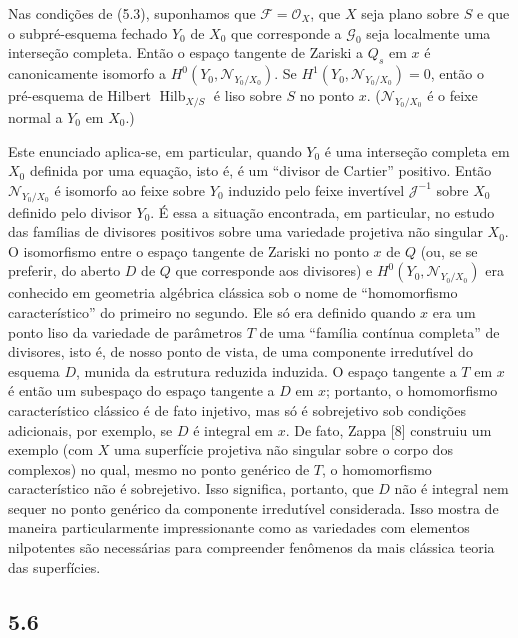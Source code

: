  Nas condições de (5.3), suponhamos que
$\mathcal F=\mathcal O_X$, que $X$ seja plano sobre $S$ e que o
subpré-esquema fechado $Y_0$ de $X_0$ que corresponde a $\mathcal G_0$ seja
localmente uma interseção completa. Então o espaço tangente de Zariski a $Q_s$
em $x$ é canonicamente isomorfo a
$H^0(Y_0,\mathcal N_{Y_0/X_0})$. Se
$H^1(Y_0,\mathcal N_{Y_0/X_0})=0$, então o pré-esquema de Hilbert
$\operatorname{Hilb}_{X/S}$ é liso sobre $S$ no ponto $x$.
($\mathcal N_{Y_0/X_0}$ é o feixe normal a $Y_0$ em $X_0$.)

 Este enunciado aplica-se, em particular, quando $Y_0$
é uma interseção completa em $X_0$ definida por uma equação, isto é, é um
``divisor de Cartier'' positivo. Então $\mathcal N_{Y_0/X_0}$ é isomorfo ao
feixe sobre $Y_0$ induzido pelo feixe invertível $\mathcal J^{-1}$ sobre $X_0$
definido pelo divisor $Y_0$. É essa a situação encontrada, em particular, no
estudo das famílias de divisores positivos sobre uma variedade projetiva não
singular $X_0$. O isomorfismo entre o espaço tangente de Zariski no ponto $x$
de $Q$ (ou, se se preferir, do aberto $D$ de $Q$ que corresponde aos divisores)
e $H^0(Y_0,\mathcal N_{Y_0/X_0})$ era conhecido em geometria algébrica
clássica sob o nome de ``homomorfismo característico'' do primeiro no segundo.
Ele só era definido quando $x$ era um ponto liso da variedade de parâmetros
$T$ de uma ``família contínua completa'' de divisores, isto é, de nosso ponto
de vista, de uma componente irredutível do esquema $D$, munida da estrutura
reduzida induzida. O espaço tangente a $T$ em $x$ é então um subespaço do
espaço tangente a $D$ em $x$; portanto, o homomorfismo característico clássico
é de fato injetivo, mas só é sobrejetivo sob condições adicionais, por exemplo,
se $D$ é integral em $x$. De fato, Zappa [8] construiu um exemplo
(com $X$ uma superfície projetiva não singular sobre o corpo dos complexos) no
qual, mesmo no ponto genérico de $T$, o homomorfismo característico não é
sobrejetivo. Isso significa, portanto, que $D$ não é integral nem sequer no
ponto genérico da componente irredutível considerada. Isso mostra de maneira
particularmente impressionante como as variedades com elementos nilpotentes
são necessárias para compreender fenômenos da mais clássica teoria das
superfícies.

\subsection*{5.6}

